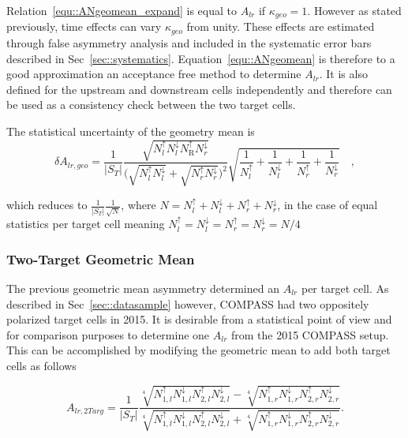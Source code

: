 Relation~\ref{equ::ANgeomean_expand} is equal to $A_{lr}$ if $\kappa_{geo} = 1$.
However as stated previously, time effects can vary $\kappa_{geo}$ from
unity. These effects are estimated through false asymmetry analysis and included
in the systematic error bars described in Sec~\ref{sec::systematics}.
Equation~\ref{equ::ANgeomean} is therefore to a good approximation an acceptance
free method to determine $A_{lr}$.  It is also defined for the upstream and
downstream cells independently and therefore can be used as a consistency check
between the two target cells.

The statistical uncertainty of the geometry mean is
\begin{equation}
  \delta A_{lr,geo} = \frac{1}{|S_T|}
  \frac{
    \sqrt{
      N_{l}^{\uparrow}N_{l}^{\downarrow}
      N_{\mathrm{ R}}^{\uparrow}N_{r}^{\downarrow}
    }
  }{
    \Big( \sqrt{N_{l}^{\uparrow}N_{l}^{\downarrow}} +
    \sqrt{N_{r}^{\uparrow}N_{r}^{\downarrow}} \Big)^2
  }
  \sqrt{
    \frac{1}{N_{l}^{\uparrow}} +
    \frac{1}{N_{l}^{\downarrow}} +
    \frac{1}{N_{r}^{\uparrow}} +
    \frac{1}{N_{r}^{\downarrow}}
  } \quad,
\end{equation}

\noindent
which reduces to $\frac{1}{|S_T|}\frac{1}{\sqrt{N}}$, where $N = N^\uparrow_l +
N^\downarrow_l + N^\uparrow_r + N^\downarrow_r$, in the case of equal statistics
per target cell meaning $N^\uparrow_l = N^\downarrow_l = N^\uparrow_r =
N^\downarrow_r = N/4$

\subsubsection{Two-Target Geometric Mean} \label{sec::TwoTargGeoMean}
The previous geometric mean asymmetry determined an $A_{lr}$ per target cell.
As described in Sec~\ref{sec::datasample} however, COMPASS had two oppositely
polarized target cells in 2015.  It is desirable from a statistical point of
view and for comparison purposes to determine one $A_{lr}$ from the 2015 COMPASS
setup.  This can be accomplished by modifying the geometric mean to add both
target cells as follows

\begin{equation}
  \label{equ::AN4TargGeomean}
  A_{lr,2Targ} =
  \frac{1}{|S_T|}
  \frac{ \sqrt[4]{ N_{1,l}^\uparrow N_{1, l}^\downarrow
      N_{2,l}^\uparrow N_{2, l}^\downarrow }
    - \sqrt[4]{ N_{1,r}^\uparrow N_{1,r}^\downarrow
      N_{2,r}^\uparrow N_{2,r}^\downarrow }
  }{
    \sqrt[4]{ N_{1,l}^\uparrow N_{1, l}^\downarrow
      N_{2,l}^\uparrow N_{2, l}^\downarrow }
    + \sqrt[4]{ N_{1,r}^\uparrow N_{1,r}^\downarrow
      N_{2,r}^\uparrow N_{2,r}^\downarrow } }.
\end{equation}

